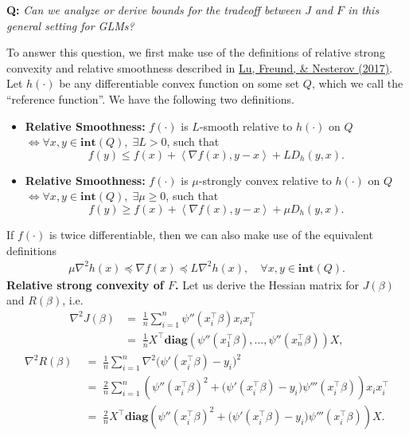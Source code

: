\documentclass[11pt]{article}
\theoremstyle{plain}
\theoremstyle{definition}
\newcommand{\ip}[2]{\left\langle #1,#2 \right\rangle}
\newcommand{\1}{\mathbf{1}}
\renewcommand{\t}{^{\top}}
\newcommand{\qt}[1]{``#1''}
\begin{document}
\begin{center}
\textbf{Q:} \textit{Can we analyze or derive bounds for the tradeoff between $J$ and $F$ in this general setting for GLMs?}   
\end{center}
To answer this question, we first make use of the definitions of relative strong convexity and relative smoothness described in \href{https://arxiv.org/pdf/1610.05708}{Lu, Freund, \& Nesterov (2017)}. Let $h(\cdot)$ be any differentiable convex function on some set $Q$, which we call the \qt{reference function}. We have the following two definitions.
\begin{itemize}
    \item \textbf{Relative Smoothness:} $f(\cdot)$ is $L$-smooth relative to $h(\cdot)$ on $Q$ $\iff \forall x,y\in \textbf{int}(Q), \;\exists L >0$, such that $$f(y)\leq f(x)+\ip{\nabla f(x)}{y-x} + L D_h(y,x).$$
    \item \textbf{Relative Smoothness:} $f(\cdot)$ is $\mu$-strongly convex relative to $h(\cdot)$ on $Q$ $\iff \forall x,y\in \textbf{int}(Q),\; \exists \mu \geq 0$, such that $$f(y)\geq f(x)+\ip{\nabla f(x)}{y-x} + \mu D_h(y,x).$$
\end{itemize}
If $f(\cdot)$ is twice differentiable, then we can also make use of the equivalent definitions
\begin{align*}
    \mu \nabla^2h(x)\preceq \nabla f(x) \preceq L \nabla^2h(x), \quad \forall x,y \in \textbf{int}(Q).
\end{align*}
\textbf{Relative strong convexity of $F$.} Let us derive the Hessian matrix for $J(\beta)$ and $R(\beta)$, i.e.
\begin{align*}
 \nabla^2J(\beta) &=\;\frac{1}{n}\sum_{i=1}^n \psi''(x_i\t\beta)x_ix_i\t\\
&=\;\frac{1}{n} X\t\textbf{diag}\left(\psi''(x_1\t\beta),\ldots, \psi''(x_n\t\beta) \right)X, 
\end{align*}
\begin{align*}
\nabla^2R(\beta)\;&=\;\frac{1}{n}\sum_{i=1}^n \nabla^2 \big(\psi'(x_i\t\beta)-y_i\big)^2\\
&=\;\frac{2}{n}\sum_{i=1}^n  \left(\psi''(x_i\t\beta)^2  + (\psi'(x_i\t\beta)-y_i\big)\psi'''(x_i\t\beta)\right) x_ix_i\t\\
&=\;\frac{2}{n} X\t\textbf{diag}\left(\psi''(x_i\t\beta)^2 + (\psi'(x_i\t\beta)-y_i\big)\psi'''(x_i\t\beta)\right)X. 
\end{align*}
\end{document}

